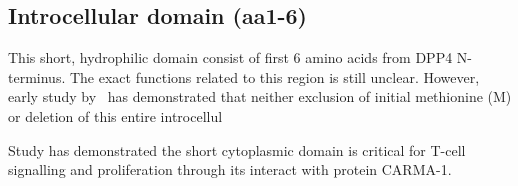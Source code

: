 \subsection{Introcellular domain (aa1-6)}

This short, hydrophilic domain consist of first 6 amino acids from DPP4 N-terminus. The exact functions related to this region is still unclear. However, early study by~\citet{Hong1990} has demonstrated that neither exclusion of initial methionine (M) or deletion of this entire introcellul

Study has demonstrated the short cytoplasmic domain is critical for T-cell signalling and proliferation through its interact with protein CARMA-1. \cite{Ohnuma_2007}